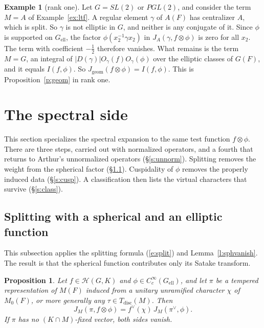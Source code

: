 \documentclass[12pt,letterpaper]{article}
\numberwithin{equation}{section}
\theoremstyle{plain}
\newtheorem{proposition}[theorem]{Proposition}
\theoremstyle{definition}
\newtheorem{example}[theorem]{Example}
\theoremstyle{remark}
\newcommand{\Hc}{\mathcal{H}}
\newcommand{\ellr}{\mathrm{ell}}
\newcommand{\Tdisc}{T_{\mathrm{disc}}}
\begin{document}
\begin{example}[rank one]\label{ex:geom}
Let $G=SL(2)$ or $PGL(2)$, and consider the term $M=A$ of Example~\ref{ex:ltf}. A regular element $\gamma$ of $A(F)$ has centralizer $A$, which is split. So $\gamma$ is not elliptic in $G$, and neither is any conjugate of it. Since $\phi$ is supported on $G_{\ellr}$, the factor $\phi(x_2^{-1}\gamma x_2)$ in $J_A(\gamma,f\otimes\phi)$ is zero for all $x_2$. The term with coefficient $-\frac12$ therefore vanishes. What remains is the term $M=G$, an integral of $|D(\gamma)|O_\gamma(f)O_\gamma(\phi)$ over the elliptic classes of $G(F)$, and it equals $I(f,\phi)$. So $J_{\mathrm{geom}}(f\otimes\phi)=I(f,\phi)$. This is Proposition~\ref{p:geom} in rank one.
\end{example}

\section{The spectral side}\label{s:spec}

This section specializes the spectral expansion to the same test function $f\otimes\phi$. There are three steps, carried out with normalized operators, and a fourth that returns to Arthur's unnormalized operators (\S\ref{s:unnorm}). Splitting removes the weight from the spherical factor (\S\ref{s:specsplit}). Cuspidality of $\phi$ removes the properly induced data (\S\ref{s:cusp}). A classification then lists the virtual characters that survive (\S\ref{s:class}).

\subsection{Splitting with a spherical and an elliptic function}\label{s:specsplit}

This subsection applies the splitting formula (\ref{e:split}) and Lemma~\ref{l:sphvanish}. The result is that the spherical function contributes only its Satake transform.

\begin{proposition}\label{p:split}
Let $f\in\Hc(G,K)$ and $\phi\in C_c^\infty(G_{\ellr})$, and let $\pi$ be a tempered representation of $M(F)$ induced from a unitary unramified character $\chi$ of $M_0(F)$, or more generally any $\tau\in\Tdisc(M)$. Then
\[
J_M(\pi,f\otimes\phi)=f^\vee(\chi)\,J_M(\pi^\vee,\phi).
\]
If $\pi$ has no $(K\cap M)$-fixed vector, both sides vanish.
\end{proposition}
\end{document}
